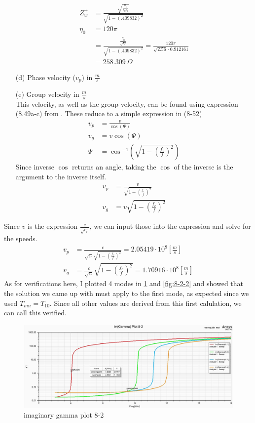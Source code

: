 \documentclass[12pt]{article}
\begin{document}
\begin{itemize}
\begin{align*}
    Z_w^+ &= \frac{\sqrt{\frac{\mu_0}{\epsilon_0\epsilon_r}}}{\sqrt{1-\left(.409832\right)^2}} \\
    \eta_0 &= 120\pi\\
          &= \frac{\frac{\eta_0}{\sqrt{\epsilon_r}}}{\sqrt{1-\left(.409832\right)^2}} = \frac{120\pi}{\sqrt{2.56}\cdot 0.912161}\\
    &= 258.309\ \Omega
  \end{align*}
\item[(d)] Phase velocity ($v_p$) in $\frac{m}{s}$
\item[(e)] Group velocity in $\frac{m}{s}$ \\
  This velocity, as well as the group velocity, can be found using expression (8.49a-c) from \cite{balanis_2012}. These reduce to a simple expression in (8-52) 
  \begin{align*}
    v_p &= \frac{v}{\cos{(\Psi)}}\\
    v_g &= v\cos{(\Psi)}\\
    \Psi &= \cos{^{-1}\left(\sqrt{1-\left(\frac{f_c}{f}\right)^2}\right)}
  \end{align*}
  Since inverse $\cos$ returns an angle, taking the $\cos$ of the inverse is the argument to the inverse itself.
  \begin{align*}
    v_p &= \frac{v}{\sqrt{1-\left(\frac{f_c}{f}\right)^2}}\\
    v_g &= v\sqrt{1-\left(\frac{f_c}{f}\right)^2}
  \end{align*}
\end{itemize}
\noindent
Since $v$ is the expression $\frac{c}{\sqrt{\epsilon_r}}$, we can input those into the expression and solve for the speeds.
\begin{align*}
  v_p &= \frac{c}{\sqrt{\epsilon_r}\sqrt{1-\left(\frac{f_c}{f}\right)^2}} = 2.05419\cdot 10^8 \left[\frac{m}{s}\right] \\
  v_g &= \frac{c}{\sqrt{\epsilon_r}}\sqrt{1-\left(\frac{f_c}{f}\right)^2} = 1.70916\cdot 10^8 \left[\frac{m}{s}\right]
\end{align*}
\newpage
\noindent
As for verifications here, I plotted 4 modes in \ref{fig:8-2} and \ref{fig:8-2-2} and showed that the solution we came up with must apply to the first mode, as expected since we used $T_{mn} = T_{10}$. Since all other values are derived from this first calulation, we can call this verified.
\begin{center}
\begin{figure}[h]
    \centering
    \includegraphics[width=16cm]{./images/im_gamma_plot_8-2.png}
    \caption{imaginary gamma plot 8-2}
    \label{fig:8-2}
  \end{figure}
\end{center}
\end{document}
